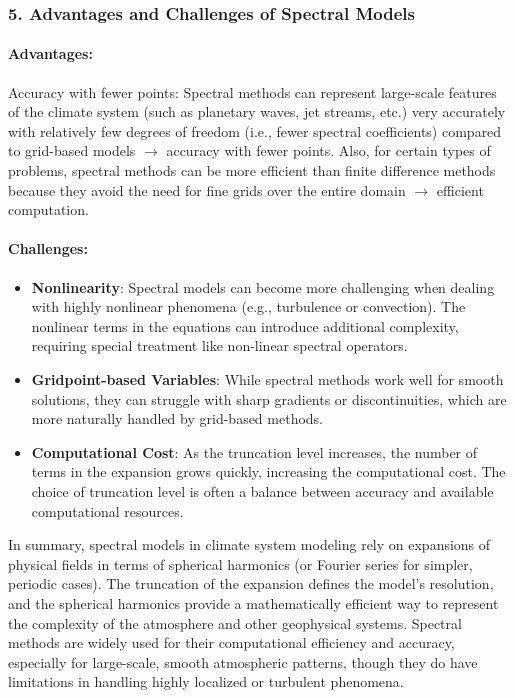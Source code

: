 \subsubsection{5. \textbf{Advantages and Challenges of Spectral Models}}

\paragraph{\textbf{Advantages}:}
 Accuracy with fewer points: Spectral methods can represent large-scale features of the climate system (such as planetary waves, jet streams, etc.) very accurately with relatively few degrees of freedom (i.e., fewer spectral coefficients) compared to grid-based models $\rightarrow$ accuracy with fewer points. Also, for certain types of problems, spectral methods can be more efficient than finite difference methods because they avoid the need for fine grids over the entire domain $\rightarrow$ efficient computation. 
\paragraph{\textbf{Challenges}:}

\begin{itemize}
    \item \textbf{Nonlinearity}: Spectral models can become more challenging when dealing with highly nonlinear phenomena (e.g., turbulence or convection). The nonlinear terms in the equations can introduce additional complexity, requiring special treatment like non-linear spectral operators.
    \item \textbf{Gridpoint-based Variables}: While spectral methods work well for smooth solutions, they can struggle with sharp gradients or discontinuities, which are more naturally handled by grid-based methods.
    \item \textbf{Computational Cost}: As the truncation level increases, the number of terms in the expansion grows quickly, increasing the computational cost. The choice of truncation level is often a balance between accuracy and available computational resources.
\end{itemize}
In summary, spectral models in climate system modeling rely on expansions of physical fields in terms of spherical harmonics (or Fourier series for simpler, periodic cases). The truncation of the expansion defines the model's resolution, and the spherical harmonics provide a mathematically efficient way to represent the complexity of the atmosphere and other geophysical systems. Spectral methods are widely used for their computational efficiency and accuracy, especially for large-scale, smooth atmospheric patterns, though they do have limitations in handling highly localized or turbulent phenomena.

